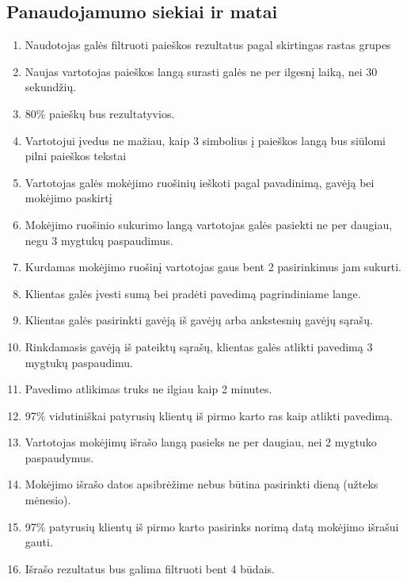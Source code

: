 \documentclass{VUMIFPSkursinis}
\begin{document}
\subsection{Panaudojamumo siekiai ir matai}
\begin{enumerate}
	\item Naudotojas galės filtruoti paieškos rezultatus pagal skirtingas rastas grupes
	\item Naujas vartotojas paieškos langą surasti galės ne per ilgesnį laiką, nei 30 sekundžių.
	\item 80\% paieškų bus rezultatyvios.
	\item Vartotojui įvedus ne mažiau, kaip 3 simbolius į paieškos langą bus siūlomi pilni paieškos tekstai
	\item Vartotojas galės mokėjimo ruošinių ieškoti pagal pavadinimą, gavėją bei mokėjimo paskirtį
	\item Mokėjimo ruošinio sukurimo langą vartotojas galės pasiekti ne per daugiau, negu 3 mygtukų paspaudimus.
	\item Kurdamas mokėjimo ruošinį vartotojas gaus bent 2 pasirinkimus jam sukurti.
	\item Klientas galės įvesti sumą bei pradėti pavedimą pagrindiniame lange.
	\item Klientas galės pasirinkti gavėją iš gavėjų arba ankstesnių gavėjų sąrašų.
	\item Rinkdamasis gavėją iš pateiktų sąrašų, klientas galės atlikti pavedimą 3 mygtukų paspaudimu.
	\item Pavedimo atlikimas truks ne ilgiau kaip 2 minutes.
	\item 97\% vidutiniškai patyrusių klientų iš pirmo karto ras kaip atlikti pavedimą.
	\item Vartotojas mokėjimų išrašo langą pasieks ne per daugiau, nei 2 mygtuko paspaudymus.
	\item Mokėjimo išrašo datos apsibrėžime nebus būtina pasirinkti dieną (užteks mėnesio).
	\item 97\% patyrusių klientų iš pirmo karto pasirinks norimą datą mokėjimo išrašui gauti.
	\item Išrašo rezultatus bus galima filtruoti bent 4 būdais.
\end{enumerate}
\pagebreak
\end{document}
